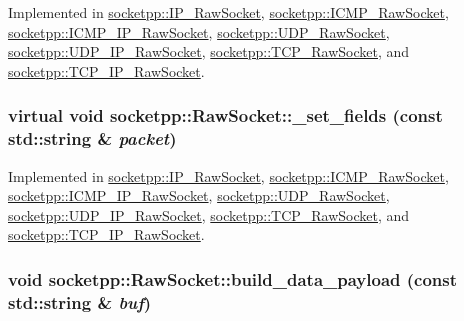 Implemented in \hyperlink{classsocketpp_1_1IP__RawSocket_6863cc399c543073e9aa3615c3f50940}{socketpp::IP\_\-RawSocket}, \hyperlink{classsocketpp_1_1ICMP__RawSocket_d8aa8d45c57eb77ab99ee84f1c5dd7da}{socketpp::ICMP\_\-RawSocket}, \hyperlink{classsocketpp_1_1ICMP__IP__RawSocket_49a62078d6febf7a11b9350de1e23903}{socketpp::ICMP\_\-IP\_\-RawSocket}, \hyperlink{classsocketpp_1_1UDP__RawSocket_fe8cc7391c23dcf011f285b1605cad6b}{socketpp::UDP\_\-RawSocket}, \hyperlink{classsocketpp_1_1UDP__IP__RawSocket_16035f1b701b898f0e4de44a9ac8bbb3}{socketpp::UDP\_\-IP\_\-RawSocket}, \hyperlink{classsocketpp_1_1TCP__RawSocket_d89a39d4bc91a76d0cb50da5cdd10fbc}{socketpp::TCP\_\-RawSocket}, and \hyperlink{classsocketpp_1_1TCP__IP__RawSocket_281508237add8a3c530bb0be0b6a1e7b}{socketpp::TCP\_\-IP\_\-RawSocket}.\hypertarget{classsocketpp_1_1RawSocket_45e6b041703cb8ae0f93dd19766865d5}{
\subsubsection[{\_\-set\_\-fields}]{\setlength{\rightskip}{0pt plus 5cm}virtual void socketpp::RawSocket::\_\-set\_\-fields (const std::string \& {\em packet})}}
\label{classsocketpp_1_1RawSocket_45e6b041703cb8ae0f93dd19766865d5}




Implemented in \hyperlink{classsocketpp_1_1IP__RawSocket_c39832f1ad83184cd5ba94c4c967f465}{socketpp::IP\_\-RawSocket}, \hyperlink{classsocketpp_1_1ICMP__RawSocket_e183b11c080f5d74dbc386ec53e7feb5}{socketpp::ICMP\_\-RawSocket}, \hyperlink{classsocketpp_1_1ICMP__IP__RawSocket_6d2f188d46030afa13f9c3971d43d518}{socketpp::ICMP\_\-IP\_\-RawSocket}, \hyperlink{classsocketpp_1_1UDP__RawSocket_a2dd7ab190a6730f9272eced4e648b50}{socketpp::UDP\_\-RawSocket}, \hyperlink{classsocketpp_1_1UDP__IP__RawSocket_40fde867fa138b495f660864023a3eb1}{socketpp::UDP\_\-IP\_\-RawSocket}, \hyperlink{classsocketpp_1_1TCP__RawSocket_6976a4726503eef03a8d446afdbaddbe}{socketpp::TCP\_\-RawSocket}, and \hyperlink{classsocketpp_1_1TCP__IP__RawSocket_f8f606ce33835813cc5c3a530e181432}{socketpp::TCP\_\-IP\_\-RawSocket}.\hypertarget{classsocketpp_1_1RawSocket_a5e01f4dec94dbbef1c122ce4d7ed4ad}{
\subsubsection[{build\_\-data\_\-payload}]{\setlength{\rightskip}{0pt plus 5cm}void socketpp::RawSocket::build\_\-data\_\-payload (const std::string \& {\em buf})}}
\label{classsocketpp_1_1RawSocket_a5e01f4dec94dbbef1c122ce4d7ed4ad}


